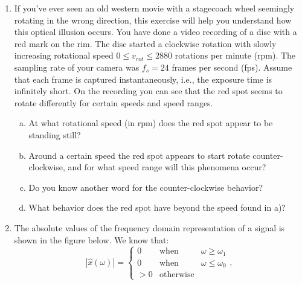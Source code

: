 \begin{enumerate}
  \item If you've ever seen an old western movie with a stagecoach
    wheel seemingly rotating in the wrong direction, this exercise
    will help you understand how this optical illusion occurs. You
    have done a video recording of a disc with a red mark on the
    rim. The disc started a clockwise rotation with slowly increasing
    rotational speed $0 \le v_{rot} \le 2880$ rotations per minute
    (rpm). The sampling rate of your camera was $f_s = 24$ frames per
    second (fps). Assume that each frame is captured instantaneously,
    i.e., the exposure time is infinitely short. On the recording you
    can see that the red spot seems to rotate differently for certain
    speeds and speed ranges.
  \begin{enumerate}[a)]
    \item At what rotational speed (in rpm) does the red spot appear to be standing still?
    \item Around a certain speed the red spot appears to start rotate counter-clockwise, and for what speed range will this phenomena occur?
    \item Do you know another word for the counter-clockwise behavior?
    \item What behavior does the red spot have beyond the speed found in a)?
  \end{enumerate}
\item The absolute values of the frequency domain representation of a signal is shown in the figure below. We know that:
  \begin{equation}
    |\hat{x}(\omega)| = \left\{\begin{array}{ccc}
    0 & \mathrm{when} & \omega \ge \omega_1\\
    0 & \mathrm{when} & \omega \le \omega_0\\
    >0 & \mathrm{otherwise} &
    \end{array}\right.,
    \end{equation}
\begin{center}
\end{center}
\end{enumerate}
